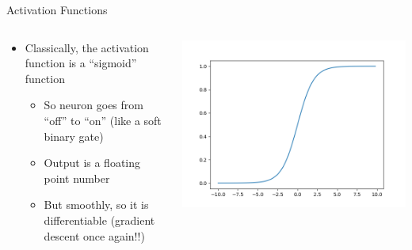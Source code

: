 \documentclass[aspectratio=169]{beamer}
\begin{document}
\begin{frame}{Activation Functions}

\begin{columns}
\begin{column}{0.6\textwidth}
\begin{itemize}
	\item Classically, the activation function is a ``sigmoid'' function
	\begin{itemize}
	\item So neuron goes from ``off'' to ``on'' (like a soft binary gate)
	\item Output is a floating point number
	\item But smoothly, so it is differentiable (gradient descent once again!!)
	\end{itemize}
\end{itemize}
\end{column}
\begin{column}{0.4\textwidth}

\includegraphics[width=1\textwidth]{lectFF/sigmoid2.png}
\end{column}
\end{columns}
\end{frame}
\end{document}
